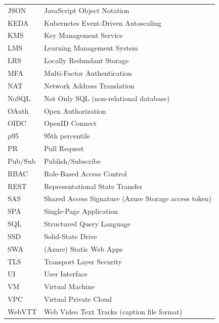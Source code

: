\documentclass[conference]{IEEEtran}
\begin{document}
\begin{table}[!h]
\begin{tabularx}{\columnwidth}{@{}L{1.3cm}Y@{}}
JSON & JavaScript Object Notation \\
KEDA & Kubernetes Event-Driven Autoscaling \\
KMS & Key Management Service \\
LMS & Learning Management System \\
LRS & Locally Redundant Storage \\
MFA & Multi-Factor Authentication \\
NAT & Network Address Translation \\
NoSQL & Not Only SQL (non-relational database) \\
OAuth & Open Authorization \\
OIDC & OpenID Connect \\
p95 & 95th percentile \\
PR & Pull Request \\
Pub/Sub & Publish/Subscribe \\
RBAC & Role-Based Access Control \\
REST & Representational State Transfer \\
SAS & Shared Access Signature (Azure Storage access token) \\
SPA & Single-Page Application \\
SQL & Structured Query Language \\
SSD & Solid-State Drive \\
SWA & (Azure) Static Web Apps \\
TLS & Transport Layer Security \\
UI & User Interface \\
VM & Virtual Machine \\
VPC & Virtual Private Cloud \\
WebVTT & Web Video Text Tracks (caption file format) \\
\bottomrule
\end{tabularx}
\end{table}
\end{document}
